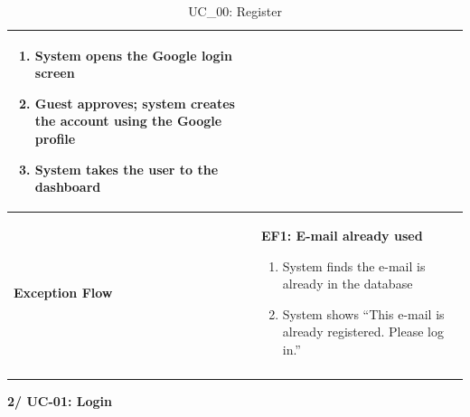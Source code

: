 \documentclass[a4paper]{article}
\newlength{\ucLeft}
\begin{document}
\begin{longtable}{|>{\bfseries}p{\ucLeft}|p{\dimexpr\linewidth-\ucLeft-2\tabcolsep-2\arrayrulewidth}|}
\begin{enumerate}[leftmargin=1.5em, nosep, topsep=2pt, partopsep=0pt, parsep=0pt, after=\strut]
    \item System opens the Google login screen
    \item Guest approves; system creates the account using the Google profile
    \item System takes the user to the dashboard
\end{enumerate}
\\ \hline
Exception Flow &
\textbf{EF1: E-mail already used}
\begin{enumerate}[leftmargin=1.5em, nosep, topsep=2pt, partopsep=0pt, parsep=0pt, after=\strut]
    \item System finds the e-mail is already in the database
    \item System shows ``This e-mail is already registered. Please log in.''
\end{enumerate}
\\ \hline
\caption{UC\_00: Register}\label{tab:uc00}
\end{longtable}

\vspace{0.5em}
\noindent\textbf{2/ UC-01: Login}
\end{document}
